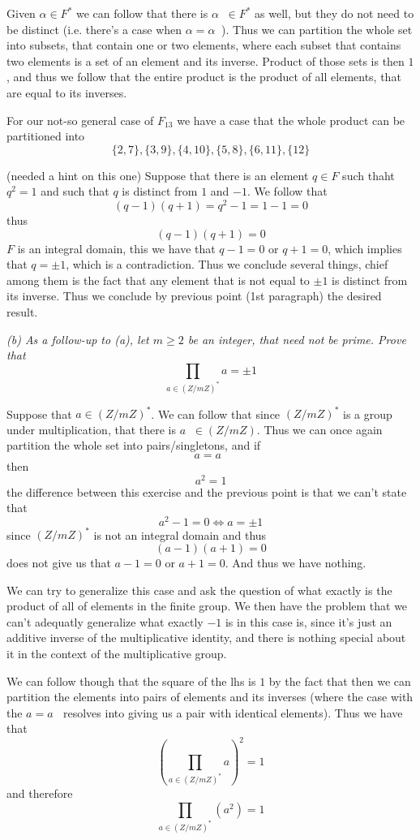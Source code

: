 \documentclass[11pt,oneside,titlepage]{book}
\DeclareMathOperator \inv {^{-1}}
\DeclareMathOperator \lra {\Leftrightarrow}
\newcommand{\set}[1]{\{ #1 \}}
\begin{document}
Given $\alpha \in F^*$ we can follow that there is $\alpha\inv \in
F^*$ as well, but they do not need to be distinct (i.e. there's a case
when $\alpha = \alpha\inv$). Thus we can partition the whole set into
subsets, that contain one or two elements, where each subset that
contains two elements is a set of an element and its inverse.  Product
of those sets is then $1$, and thus we follow that the entire product
is the product of all elements, that are equal to its inverses.

For our not-so general case of $F_{13}$ we have a case that the whole
product can be partitioned into
$$\set{2, 7}, \set{3, 9}, \set{4, 10}, \set{5, 8},
\set{6, 11}, \set{12}$$

(needed a hint on this one) Suppose that there is an element $q \in F$
such thaht $q^2 = 1$ and such that $q$ is distinct from $1$ and
$-1$. We follow that
$$(q - 1) (q + 1) = q^2 - 1 = 1 - 1 = 0$$
thus
$$(q - 1)( q + 1) = 0$$
$F$ is an integral domain, this we have that $q - 1 = 0$ or $q + 1 =
0$, which implies that $q = \pm 1$, which is a contradiction. Thus we
conclude several things, chief among them is the fact that any element
that is not equal to $\pm 1$ is distinct from its inverse. Thus we
conclude by previous point (1st paragraph) the desired result.

\textit{(b) As a follow-up to (a), let $m \geq 2$ be an integer, that
need not be prime. Prove that
  $$\prod_{a \in (Z/mZ)^*}a = \pm 1$$
}

Suppose that $a \in (Z/mZ)^*$. We can follow that since $(Z/mZ)^*$ is
a group under multiplication, that there is $a\inv \in (Z/mZ)$. Thus
we can once again partition the whole set into pairs/singletons, and
if
$$a = a\inv$$
then
$$a^2 = 1$$
the difference between this exercise and the previous point is that we
can't state that
$$a^2 - 1 = 0 \lra a = \pm 1$$
since $(Z/mZ)^*$ is not an integral domain and thus
$$(a - 1)(a + 1) = 0$$
does not give us that $a - 1 = 0$ or $a + 1 = 0$. And thus we have
nothing.

We can try to generalize this case and ask the question of what
exactly is the product of all of elements in the finite group.  We
then have the problem that we can't adequatly generalize what exactly
$-1$ is in this case is, since it's just an additive inverse of the
multiplicative identity, and there is nothing special about it in the
context of the multiplicative group.

We can follow though that the square of the lhs is $1$ by the fact
that then we can partition the elements into pairs of elements and its
inverses (where the case with the $a = a\inv$ resolves into giving us
a pair with identical elements). Thus we have that
$$(\prod_{a \in (Z/mZ)^*}a)^2 = 1$$
and therefore
$$\prod_{a \in (Z/mZ)^*}(a^2) = 1$$
\end{document}
